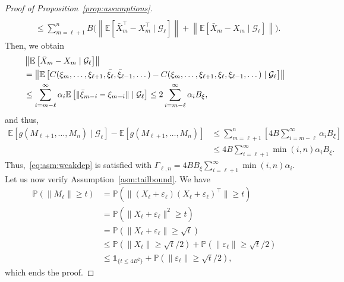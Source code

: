 \documentclass[11pt,a4paper]{article}
\theoremstyle{remark}
\theoremstyle{definition}
\theoremstyle{definition}
\newcommand{\rc}{\color{black}}
\begin{document}
\begin{bibunit}[apalike]
\begin{proof}[Proof of Proposition~\ref{prop:assumptions}]
\begin{align*}
 \\
 & \leq \sum_{m=\ell+1}^n  B \biggl( \left\| \mathbb{E}\left[  \bar{X}_{m}^\top - X_{m}^\top  \mid \mathcal{G}_{\ell}\right]   \right\| + \left\| \mathbb{E}\left[  \bar{X}_m   - X_m   \mid \mathcal{G}_{\ell}\right]   \right\| \biggr).
\end{align*}
Then, we obtain
\begin{align*}
& \left\| \mathbb{E}\left[  \bar{X}_m   - X_m   \mid \mathcal{G}_{\ell}\right]  \right\|
\\
& = {\rc\left\| \mathbb{E}\left[ C(\xi_m,\dots,\xi_{\ell+1},\bar{\xi_\ell},\bar{\xi}_{\ell-1},\dots)- C(\xi_m,\dots,\xi_{\ell+1},\xi_\ell,\xi_{\ell-1},\dots)  \mid \mathcal{G}_{\ell}\right]  \right\|}
\\
& \leq \sum_{i=m-\ell}^\infty \alpha_i \mathbb{E}\left[  \|\bar{\xi}_{m-i} - \xi_{m-i} \|  \mid \mathcal{G}_{\ell}\right] 
 \leq 2 \sum_{i=m-\ell}^\infty \alpha_i B_\xi,
\end{align*}
and thus,
\begin{align*}
  \mathbb{E}[g(M_{\ell+1},\dots,M_n)\mid \mathcal{G}_\ell] - \mathbb{E}[g(M_{\ell+1},\dots,M_n)]
  & \leq \sum_{m=\ell+1}^n \left[  4 B \sum_{i=m-\ell}^\infty \alpha_i B_\xi \right]
  \\
  & \leq 4 B \sum_{i=\ell+1}^\infty \min(i,n) \alpha_i B_\xi.
\end{align*}
Thus,~\eqref{eq:asm:weakdep} is satisfied with $\Gamma_{\ell,n} =  4 B B_\xi \sum_{i=\ell+1}^\infty \min(i,n) \alpha_i $.
Let us now verify Assumption~\ref{asm:tailbound}. We have
\begin{align*}
\mathbb{P}(\|M_\ell\| \geq t )
&
= \mathbb{P}(\|(X_\ell+\varepsilon_{\ell})(X_{\ell}+\varepsilon_{\ell})^\top \| \geq t )
\\
& = \mathbb{P}(\|X_\ell+\varepsilon_{\ell} \|^2   \geq t )
\\
& = \mathbb{P}(\|X_\ell+\varepsilon_{\ell} \|  \geq \sqrt{t} ) 
\\
&
\leq  \mathbb{P}(\|X_\ell\| \geq \sqrt{t}/2 ) +  \mathbb{P}(\|\varepsilon_\ell\| \geq \sqrt{t}/2 )
\\
& \leq  \mathbf{1}_{\{t\leq 4B^2\}} +  \mathbb{P}(\|\varepsilon_\ell\| \geq \sqrt{t}/2 ),
\end{align*}
which ends the proof.
\end{proof}




\end{bibunit}
\end{document}
